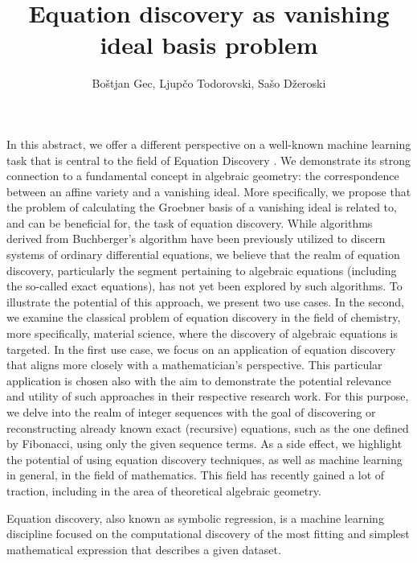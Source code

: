 \documentclass[runningheads]{llncs}
\title{Equation discovery as vanishing ideal basis problem}
\author{Boštjan Gec\inst{1,2}, Ljupčo Todorovski\inst{1,2,3}, Sašo Džeroski\inst{1,2}
}
\institute{Department of Knowledge Technologies, Jo\v{z}ef Stefan Institute, Ljubljana, Slovenia \and
Jozef Stefan International Postgraduate School, Ljubljana, Slovenia \and
Faculty of Mathematics and Physics, University of Ljubljana, 1000 Ljubljana, Slovenia
}
\begin{document}
\maketitle


In this abstract, we offer a different perspective on a well-known machine learning task that is central to the field of Equation Discovery \cite{encyclopED}. 
We demonstrate its strong connection to a fundamental concept in algebraic geometry: the correspondence between an affine variety and a vanishing ideal. More specifically, we propose that the problem of calculating the Groebner basis of a vanishing ideal is related to, and can be beneficial for, the task of equation discovery.
While algorithms derived from Buchberger’s algorithm have been previously utilized 
to discern systems of ordinary differential equations, we believe that the realm 
of equation discovery, particularly the segment pertaining to algebraic equations 
(including the so-called exact equations), 
has not yet been explored by such algorithms.
To illustrate the potential of this approach, we present two use cases. 
In the second, we examine the classical problem of equation discovery in the field 
of chemistry, more specifically, material science, 
where the discovery of algebraic equations is targeted.
In the first use case, we focus on an application of equation discovery that aligns more closely with a mathematician’s perspective. 
This particular application is chosen also with the aim 
to demonstrate the potential relevance and utility of such approaches 
in their respective research work. 
For this purpose, we delve into the realm of integer sequences with the goal of discovering or reconstructing already known exact (recursive) equations, such as the one defined by Fibonacci, using only the given sequence terms.
As a side effect, we highlight the potential of using equation discovery techniques, as well as machine learning in general, in the field of mathematics. This field has recently gained a lot of traction, including in the area of theoretical algebraic geometry.

Equation discovery, also known as symbolic regression, is a machine learning discipline focused on the computational discovery of the most fitting and simplest mathematical expression that describes a given dataset.
\end{document}

